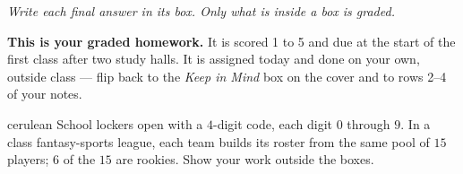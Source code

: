 \documentclass[12pt]{article}
\begin{document}
{\small\itshape Write each final answer in its box. Only what is inside a box is graded.}\par

\vspace{0.08in}

\begin{remindbox}
\small
\textbf{This is your graded homework.} It is scored 1 to 5 and due at
the start of the first class after two study halls. It is assigned today and done on your own,
outside class --- flip back to the \emph{Keep in Mind} box on the cover and to rows 2--4 of
your notes.
\end{remindbox}

\vspace{0.06in}

\boxguard[20]
\begin{scenariobox}{cerulean}
School lockers open with a $4$-digit code, each digit $0$ through $9$. In a class
fantasy-sports league, each team builds its roster from the same pool of $15$ players;
$6$ of the $15$ are rookies. Show your work outside the boxes.
\end{scenariobox}

\vspace{0.06in}
\end{document}
